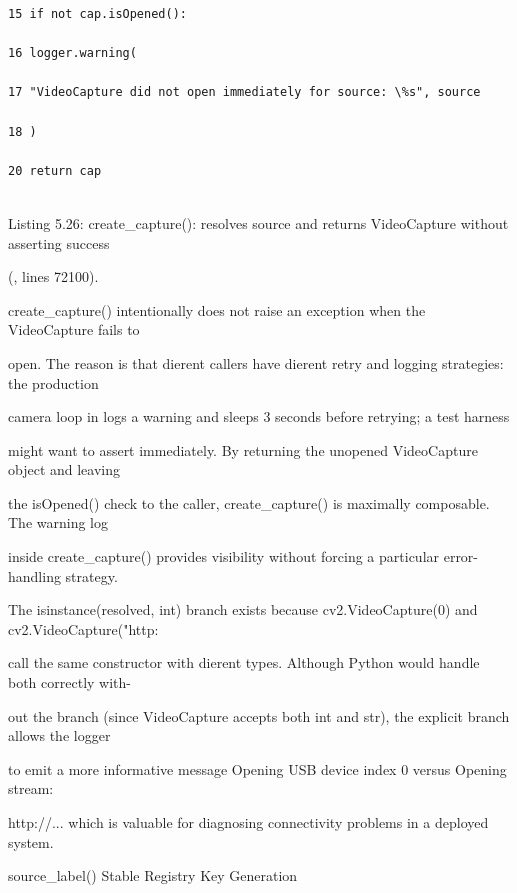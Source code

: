 \begin{listingbox}
	\begin{verbatim}
15 if not cap.isOpened():

16 logger.warning(

17 "VideoCapture did not open immediately for source: \%s", source

18 )

20 return cap


\end{verbatim}
\end{listingbox}
Listing 5.26: create\_capture(): resolves source and returns VideoCapture without asserting success

(, lines 72100).

create\_capture() intentionally does not raise an exception when the VideoCapture fails to

open. The reason is that dierent callers have dierent retry and logging strategies: the production

camera loop in logs a warning and sleeps 3 seconds before retrying; a test harness

might want to assert immediately. By returning the unopened VideoCapture object and leaving

the isOpened() check to the caller, create\_capture() is maximally composable. The warning log

inside create\_capture() provides visibility without forcing a particular error-handling strategy.

The isinstance(resolved, int) branch exists because cv2.VideoCapture(0) and cv2.VideoCapture("http:

call the same constructor with dierent types. Although Python would handle both correctly with-

out the branch (since VideoCapture accepts both int and str), the explicit branch allows the logger

to emit a more informative message  Opening USB device index 0 versus Opening stream:

http://...  which is valuable for diagnosing connectivity problems in a deployed system.

source\_label()  Stable Registry Key Generation

